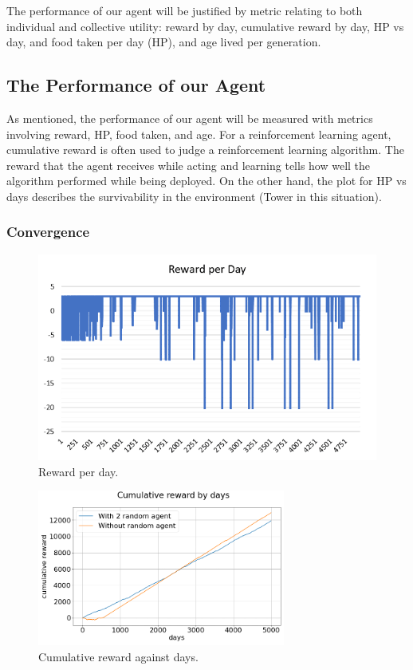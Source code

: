 The performance of our agent will be justified by metric relating to both individual and collective utility: reward by day, cumulative reward by day, HP vs day, and food taken per day (HP), and age lived per generation.

\subsection{The Performance of our Agent}
As mentioned, the performance of our agent will be measured with metrics involving reward, HP, food taken, and age. For a reinforcement learning agent, cumulative reward is often used to judge a reinforcement learning algorithm. The reward that the agent receives while acting and learning tells how well the algorithm performed while being deployed. On the other hand, the plot for HP vs days describes the survivability in the environment (Tower in this situation).
\subsubsection{Convergence}
\begin{figure}
\centering
\includegraphics{004_team_2_agent_design/rewardperday}
\caption{Reward per day.}
\label{rewday-team2}
\end{figure}

\begin{figure}
\centering
\includegraphics{004_team_2_agent_design/cumrewardbydays}
\caption{Cumulative reward against days.}
\label{cumday-team2}
\end{figure}

